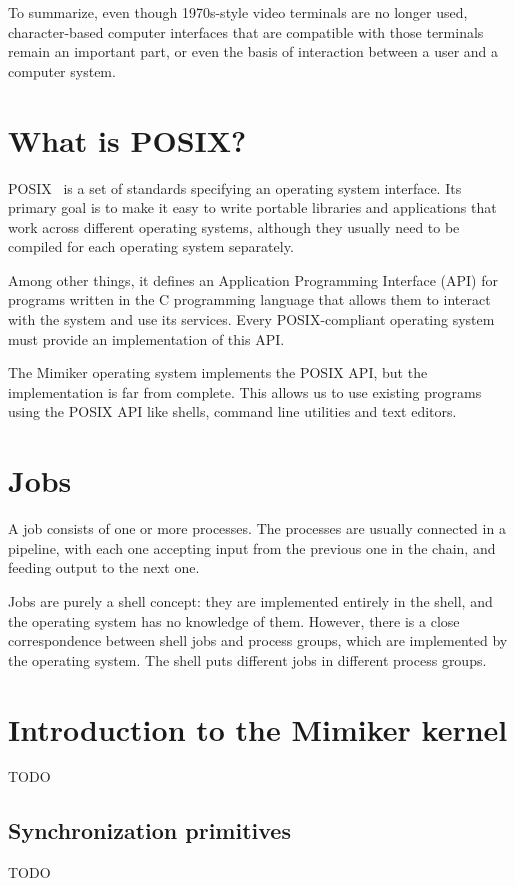\documentclass[shortabstract, manyadvisors, english, mgr]{iithesis}
\begin{document}
To summarize, even though 1970s-style video terminals are no longer used,
character-based computer interfaces that are compatible with those terminals
remain an important part, or even the basis of interaction between a user and a
computer system.

\section{What is POSIX?}

POSIX~\cite{posix} is a set of standards specifying an operating system
interface. Its primary goal is to make it easy to write portable libraries and
applications that work across different operating systems, although they usually
need to be compiled for each operating system separately.

Among other things, it defines an Application Programming Interface (API) for
programs written in the C programming language that allows them to interact with
the system and use its services. Every POSIX-compliant operating system must
provide an implementation of this API.

The Mimiker operating system implements the POSIX API, but the implementation is
far from complete. This allows us to use existing programs using the POSIX API
like shells, command line utilities and text editors.

\section{Jobs}

A job consists of one or more processes. The processes are usually connected in
a pipeline, with each one accepting input from the previous one in the chain,
and feeding output to the next one.

Jobs are purely a shell concept: they are implemented entirely in the shell,
and the operating system has no knowledge of them. However, there is a close
correspondence between shell jobs and process groups, which are implemented by
the operating system. The shell puts different jobs in different process groups.

\section{Introduction to the Mimiker kernel}
TODO
\subsection{Synchronization primitives}
TODO
\end{document}
